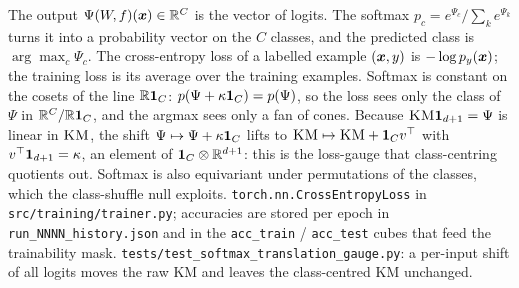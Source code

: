 {The output $\Psi(W\!,f)(\boldsymbol{x})\in\mathbb{R}^C$ is the vector of logits. The softmax $p_c=e^{\Psi_c}/\sum_k e^{\Psi_k}$ turns it into a probability vector on the $C$ classes, and the predicted class is $\arg\max_c \Psi_c$. The cross-entropy loss of a labelled example $(\boldsymbol{x},y)$ is $-\log p_y(\boldsymbol{x})$; the training loss is its average over the training examples.}
{Softmax is constant on the cosets of the line $\mathbb{R}\boldsymbol{1}_C$: $p(\Psi+\kappa\boldsymbol{1}_C)=p(\Psi)$, so the loss sees only the class of $\Psi$ in $\mathbb{R}^C/\mathbb{R}\boldsymbol{1}_C$, and the argmax sees only a fan of cones. Because $\textsc{KM}\boldsymbol{1}_{d+1}=\Psi$ is linear in $\textsc{KM}$, the shift $\Psi\mapsto\Psi+\kappa\boldsymbol{1}_C$ lifts to $\textsc{KM}\mapsto\textsc{KM}+\boldsymbol{1}_C v^\top$ with $v^\top\boldsymbol{1}_{d+1}=\kappa$, an element of $\boldsymbol{1}_C\otimes\mathbb{R}^{d+1}$: this is the loss-gauge that class-centring quotients out. Softmax is also equivariant under permutations of the classes, which the class-shuffle null exploits.}
{\texttt{torch.nn.CrossEntropyLoss} in \texttt{src/training/trainer.py}; accuracies are stored per epoch in \texttt{run\_NNNN\_history.json} and in the \texttt{acc\_train} / \texttt{acc\_test} cubes that feed the trainability mask.}
{\texttt{tests/test\_softmax\_translation\_gauge.py}: a per-input shift of all logits moves the raw KM and leaves the class-centred KM unchanged.}

